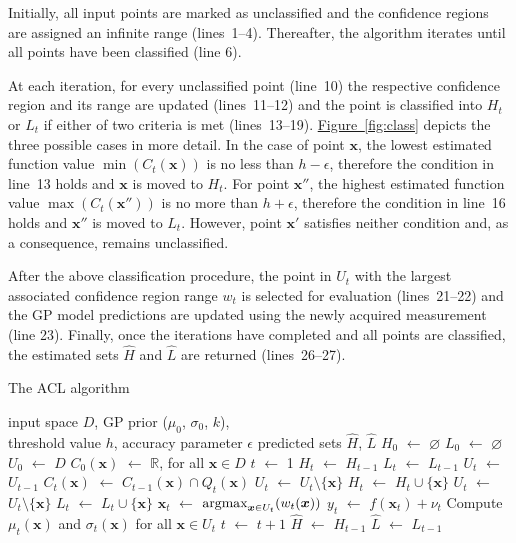 \documentclass{article}
\def\*#1{\bm{#1}}
\newcommand*\LET[2]{\STATE #1 $\gets$ #2}
\newcommand{\figref}[1]{\hyperref[#1]{\mbox{Figure~\ref*{#1}}}}
\newcommand{\argmax}{\operatornamewithlimits{argmax}}
\newcommand{\acl}{\textsf{ACL}\xspace}
\begin{document}
Initially, all input points are marked as unclassified and the
confidence regions are assigned an infinite range (lines~1--4). Thereafter,
the algorithm iterates until all points have been classified (line 6).

At each iteration, for every unclassified point
(line~10) the respective confidence region and its range are updated
(lines~11--12) and the point is classified into $H_t$ or $L_t$ if either
of two criteria is met (lines~13--19). \figref{fig:class} depicts the
three possible cases in more detail. In the case of point $\*x$,
the lowest estimated function value $\min(C_t(\*x))$ is no less
than $h-\epsilon$, therefore the condition in line~13 holds and $\*x$
is moved to $H_t$. For point $\*x''$, the highest estimated
function value $\max(C_t(\*x''))$ is no more than $h+\epsilon$,
therefore the condition in line~16 holds and $\*x''$ is moved to $L_t$.
However, point $\*x'$ satisfies neither condition and, as a consequence,
remains unclassified.

After the above classification procedure, the point in $U_t$
with the largest associated confidence region range $w_t$ is selected for
evaluation (lines~21--22) and the GP model predictions are updated using the
newly acquired measurement (line 23). Finally, once the iterations have
completed and all points are classified, the estimated sets $\hat{H}$ and
$\hat{L}$ are returned  (lines~26--27).

\begin{algorithm}[tb]
  \caption{The \acl algorithm}
  \label{alg:acl}
\begin{algorithmic}[1]
  \REQUIRE input space $D$, GP prior ($\mu_0$, $\sigma_0$, $k$),\\
           \hspace{1.9em}threshold value $h$, accuracy parameter $\epsilon$
  \ENSURE predicted sets $\hat{H}$, $\hat{L}$
  \LET{$H_0$}{$\varnothing$}
  \LET{$L_0$}{$\varnothing$}
  \LET{$U_0$}{$D$}
  \LET{$C_0(\*x)$}{$\mathbb{R}$, for all $\*x \in D$}
  \LET{$t$}{1}
    \LET{$H_t$}{$H_{t-1}$}
    \LET{$L_t$}{$L_{t-1}$}
    \LET{$U_t$}{$U_{t-1}$}
    \FORALL{$\*x \in U_{t-1}$}
      \LET{$C_{t}(\*x)$}{$C_{t-1}(\*x) \cap Q_t(\*x)$}
      \IF{$\min(C_t(\*x)) + \epsilon \geq h$}
        \LET{$U_t$}{$U_t \setminus \{\*x\}$}
        \LET{$H_t$}{$H_t \cup \{\*x\}$}
      \ELSIF{$\max(C_t(\*x)) - \epsilon \leq h$}
        \LET{$U_t$}{$U_t \setminus \{\*x\}$}
        \LET{$L_t$}{$L_t \cup \{\*x\}$}
      \ENDIF
    \ENDFOR
    \LET{$\*x_t$}{$\argmax_{\*x \in U_t}(w_t(\*x))$}
    \LET{$y_t$}{$f(\*x_t) + \nu_t$}
    \STATE Compute $\mu_t(\*x)$ and $\sigma_t(\*x)$ for all $\*x \in U_t$
    \LET{$t$}{$t + 1$}
  \ENDWHILE
  \LET{$\hat{H}$}{$H_{t-1}$}
  \LET{$\hat{L}$}{$L_{t-1}$}
\end{algorithmic}
\end{algorithm}
\end{document}
